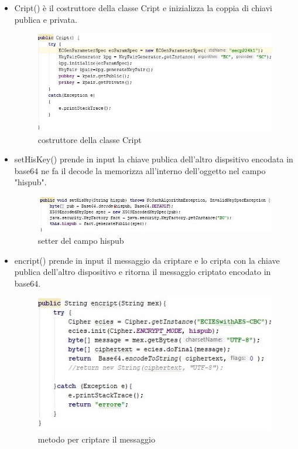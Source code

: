 \begin{itemize}
    \item Cript() è il costruttore della classe Cript e
    inizializza la coppia di chiavi publica e privata. 
    \begin{figure}
        \caption{costruttore della classe Cript}
        \includegraphics[width=1\columnwidth]{imgs/Criptconstructor.jpg}
    \end{figure}

    \item setHisKey() prende in input la chiave publica dell'altro dispsitivo
    encodata in base64 ne fa il decode la memorizza all'interno dell'oggetto
    nel campo "hispub".
    \begin{figure}
        \caption{setter del campo hispub}
        \includegraphics[width=1  \columnwidth]{imgs/sethiskey.jpg}
    \end{figure}



    \item encript() prende in input il messaggio da criptare e lo cripta con la
    chiave publica dell'altro dispositivo e ritorna il messaggio criptato
    encodato in base64.
    \begin{figure}
        \caption{metodo per criptare il messaggio}
        \includegraphics[width=0.8  \columnwidth]{imgs/encript.jpg}
    \end{figure}


\end{itemize}
